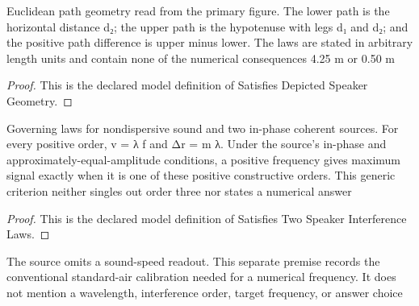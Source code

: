 \begin{definition}
  \label{def:physics:phyx-mini-0314:phyxminiproblems-problemphyxmini0314-satisfiesdepictedspeakergeometry}
  Euclidean path geometry read from the primary figure. The lower path is the horizontal distance d₂; the upper path is the hypotenuse with legs d₁ and d₂; and the positive path difference is upper minus lower. The laws are stated in arbitrary length units and contain none of the numerical consequences 4.25 m or 0.50 m
\end{definition}
\begin{proof}
  This is the declared model definition of Satisfies Depicted Speaker Geometry.
\end{proof}
\begin{definition}
  \label{def:physics:phyx-mini-0314:phyxminiproblems-problemphyxmini0314-satisfiestwospeakerinterferencelaws}
  Governing laws for nondispersive sound and two in-phase coherent sources. For every positive order, v = λ f and Δr = m λ. Under the source's in-phase and approximately-equal-amplitude conditions, a positive frequency gives maximum signal exactly when it is one of these positive constructive orders. This generic criterion neither singles out order three nor states a numerical answer
\end{definition}
\begin{proof}
  This is the declared model definition of Satisfies Two Speaker Interference Laws.
\end{proof}
\begin{definition}
  \label{def:physics:phyx-mini-0314:phyxminiproblems-problemphyxmini0314-hasstandardairsoundspeedcalibration}
  The source omits a sound-speed readout. This separate premise records the conventional standard-air calibration needed for a numerical frequency. It does not mention a wavelength, interference order, target frequency, or answer choice
\end{definition}
